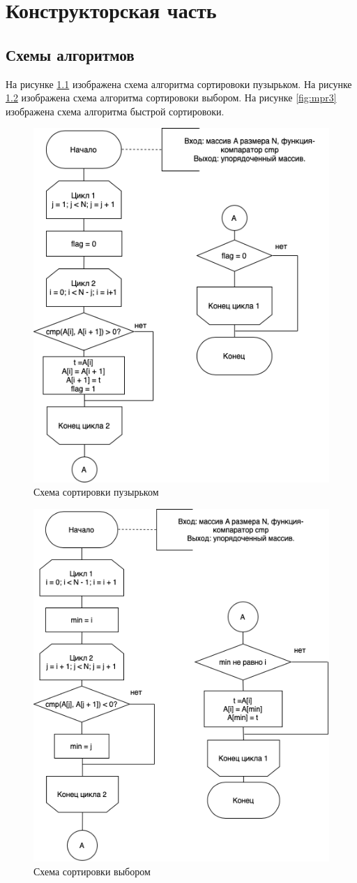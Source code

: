\documentclass{report}
\begin{document}
\clearpage

\chapter{Конструкторская часть}

\section{Схемы алгоритмов}
На рисунке \ref{fig:mpr1} изображена схема алгоритма сортировоки пузырьком. На рисунке \ref{fig:mpr2} изображена схема алгоритма сортировоки выбором. На рисунке \ref{fig:mpr3} изображена схема алгоритма быстрой сортировоки.\newline
\newline
\begin{figure}[hp!]
	\centering
	\includegraphics[width=0.7\linewidth]{report_files/bubble_sort.png}
	\caption{Схема сортировки пузырьком}
	\label{fig:mpr1}
\end{figure}
\newpage
\begin{figure}[hp!]
	\centering
	\includegraphics[width=0.7\linewidth]{report_files/selection_sort.png}
	\caption{Схема сортировки выбором}
	\label{fig:mpr2}
\end{figure}
\end{document}

